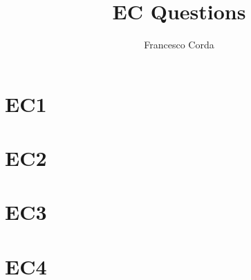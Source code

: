 \documentclass[10pt,a4paper]{report}
\author{Francesco Corda}
\title{EC Questions}
\begin{document}
\maketitle

\tableofcontents{}

\chapter{EC1}


\chapter{EC2}


\chapter{EC3}


\chapter{EC4}

\end{document}
